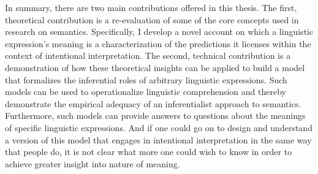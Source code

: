 In summary, there are two main contributions offered in this thesis. The first, theoretical contribution is a re-evaluation of some of the core concepts used in research on semantics. Specifically, I develop a novel account on which a linguistic expression's meaning is a characterization of the predictions it licenses within the context of intentional interpretation. The second, technical contribution is a demonstration of how these theoretical insights can be applied to build a model that formalizes the inferential roles of arbitrary linguistic expressions. Such models can be used to operationalize linguistic comprehension and thereby demonstrate the empirical adequacy of an inferentialist approach to semantics. Furthermore, such models can provide answers to questions about the meanings of specific linguistic expressions. And if one could go on to design and understand a version of this model that engages in intentional interpretation in the same way that people do, it is not clear what more one could wish to know in order to achieve greater insight into nature of meaning.